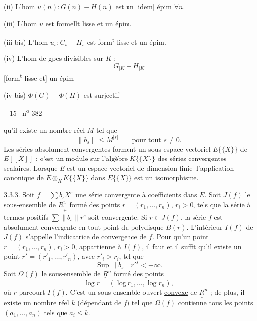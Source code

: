 (ii) L'hom $u(n):G(n)-H(n)$ est un [idem] épim $\forall n$.

(iii) L'hom $u$ est \uline{formellt lisse} et un \uline{épim.}

(iii bis) L'hom $u_s:G_s-H_s$ est form\textsuperscript{t} lisse et un épim.

(iv) L'hom de gpes divisibles sur $K$ :
\[
G_{|K}-H_{|K}
\]
 [form\textsuperscript{t} lisse et] un épim

(iv bis) $\Phi(G)-\Phi(H)$ est surjectif


\begin{center}-- 15 --\hfill n\textsuperscript{o} 382\end{center}
qu'il existe un nombre réel $M$ tel que
\[
\lVert b_s\rVert\leq M^{|s|}\qquad\text{pour tout }s\ne0.
\]
Les séries absolument convergentes forment un sous-espace vectoriel $E\{\{X\}\}$ de $E[[X]]$ ; c'est un module sur l'algèbre $K\{\{X\}\}$ des séries convergentes scalaires. Lorsque $E$ est un espace vectoriel de dimension finie, l'application canonique de $E\otimes_K K\{\{X\}\}$ dans $E\{\{X\}\}$ est un isomorphisme.

3.3.3. Soit $f=\sum b_sX^s$ une série convergente à coefficients dans $E$. Soit $J(f)$ le sous-ensemble de $\underline{\underline{R}}_+^n$ formé des points $r=(r_1,\ldots,r_n)$, $r_i>0$, tels que la série à termes positifs $\sum\lVert b_s\rVert r^s$ soit convergente. Si $r\in J(f)$, la série $f$ est absolument convergente en tout point du polydisque $B(r)$. L'intérieur $I(f)$ de $J(f)$ s'appelle \uline{l'indicatrice de convergence} de $f$. Pour qu'un point $r=(r_1,\ldots,r_n)$, $r_i>0$, appartienne à $I(f)$, il faut et il suffit qu'il existe un point $r'=(r'_1,\ldots,r'_n)$, avec $r'_i>r_i$, tel que
\[
\operatorname{Sup}\lVert b_s\rVert r'^{s}<+\infty.
\]
Soit $\Omega(f)$ le sous-ensemble de $\underline{\underline{R}}^n$ formé des points
\[
\log r=(\log r_1,\ldots,\log r_n),
\]
où $r$ parcourt $I(f)$. C'est un sous-ensemble ouvert \uline{convexe} de $\underline{\underline{R}}^n$ ; de plus, il existe un nombre réel $k$ (dépendant de $f$) tel que $\Omega(f)$ contienne tous les points $(a_1,\ldots,a_n)$ tels que $a_i\leq k$.

